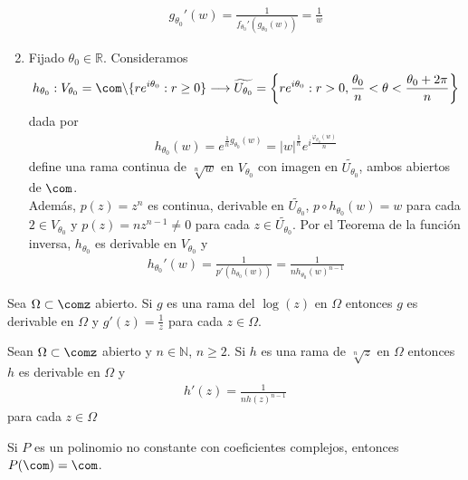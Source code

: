 \begin{ejemplo}
\begin{enumerate}
    \begin{align*}
        g_{\theta_0}'(w) = \frac{1}{f_{\theta_0}'(g_{\theta_0}(w))} = \frac{1}{w}
    \end{align*}
    \item Fijado $\theta_0 \in \mathbb{R}$. Consideramos
    \begin{align*}
        h_{\theta_0} : V_{\theta_0}  = \com \backslash \{re^{i\theta_0} : r\ge 0 \} \longrightarrow \widetilde{U_{\theta_0}} = \left\{re^{i\theta_0} : r > 0, \frac{\theta_0}{n} < \theta < \frac{\theta_0 + 2\pi}{n} \right\}
    \end{align*}
    dada por
    \begin{align*}
        h_{\theta_0}(w) = e^{\frac{1}{n}g_{\theta_0}(w)} = |w|^{\frac{1}{n}}e^{i\frac{\varphi_{\theta_0}(w)}{n}}
    \end{align*}
    define una rama continua de $\sqrt[n]{w}$ en $V_{\theta_0}$ con imagen en $\widetilde{U_{\theta_0}}$, ambos abiertos de $\com$.
    \\
    \newline
    Además, $p(z) = z^n$ es continua, derivable en $\widetilde{U_{\theta_0}}$,  $p \circ h_{\theta_0}(w) = w$ para cada $2 \in V_{\theta_0}$ y $p(z) = nz^{n-1} \not = 0$ para cada $z \in \widetilde{U_{\theta_0}}$. Por el Teorema de la función inversa, $h_{\theta_0}$ es derivable en $V_{\theta_0}$ y 
    \begin{align*}
        h_{\theta_0}'(w) = \frac{1}{p'(h_{\theta_0}(w))} = \frac{1}{nh_{\theta_0}(w)^{n-1}}
    \end{align*}
\end{enumerate}
\end{ejemplo}

\begin{teo}
Sea $\Omega \subset \comz$ abierto. Si $g$ es una rama del $\log(z)$ en $\Omega$ entonces $g$ es derivable en $\Omega$ y $g'(z) = \frac{1}{z}$ para cada $z \in \Omega$.
\end{teo}

\begin{teo}
Sean $\Omega \subset \comz$ abierto y $n \in \mathbb{N}$, $n \ge 2$. Si $h$ es una rama de $\sqrt[n]{z}$ en $\Omega$ entonces $h$ es derivable en $\Omega$ y
\begin{align*}
    h'(z) = \frac{1}{nh(z)^{n-1}}
\end{align*}
para cada $z \in \Omega$
\end{teo}

\begin{teo}
Si $P$ es un polinomio no constante con coeficientes complejos, entonces $P(\com) = \com$.
\end{teo}

